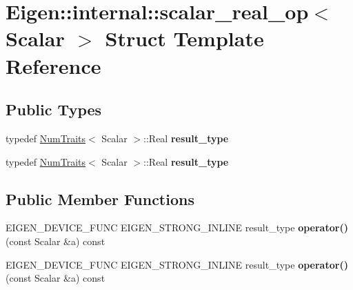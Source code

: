 \hypertarget{struct_eigen_1_1internal_1_1scalar__real__op}{}\section{Eigen\+:\+:internal\+:\+:scalar\+\_\+real\+\_\+op$<$ Scalar $>$ Struct Template Reference}
\label{struct_eigen_1_1internal_1_1scalar__real__op}
\subsection*{Public Types}
\begin{DoxyCompactItemize}
\item 
\mbox{\label{struct_eigen_1_1internal_1_1scalar__real__op_af6520ddd4677e32fc7c8d86c3d2f4033}} 
typedef \hyperlink{group___core___module_struct_eigen_1_1_num_traits}{Num\+Traits}$<$ Scalar $>$\+::Real {\bfseries result\+\_\+type}
\item 
\mbox{\label{struct_eigen_1_1internal_1_1scalar__real__op_af6520ddd4677e32fc7c8d86c3d2f4033}} 
typedef \hyperlink{group___core___module_struct_eigen_1_1_num_traits}{Num\+Traits}$<$ Scalar $>$\+::Real {\bfseries result\+\_\+type}
\end{DoxyCompactItemize}
\subsection*{Public Member Functions}
\begin{DoxyCompactItemize}
\item 
\mbox{\label{struct_eigen_1_1internal_1_1scalar__real__op_ab7456c0d19c3abd50af51c799b0a5fee}} 
E\+I\+G\+E\+N\+\_\+\+D\+E\+V\+I\+C\+E\+\_\+\+F\+U\+NC E\+I\+G\+E\+N\+\_\+\+S\+T\+R\+O\+N\+G\+\_\+\+I\+N\+L\+I\+NE result\+\_\+type {\bfseries operator()} (const Scalar \&a) const
\item 
\mbox{\label{struct_eigen_1_1internal_1_1scalar__real__op_ab7456c0d19c3abd50af51c799b0a5fee}} 
E\+I\+G\+E\+N\+\_\+\+D\+E\+V\+I\+C\+E\+\_\+\+F\+U\+NC E\+I\+G\+E\+N\+\_\+\+S\+T\+R\+O\+N\+G\+\_\+\+I\+N\+L\+I\+NE result\+\_\+type {\bfseries operator()} (const Scalar \&a) const
\end{DoxyCompactItemize}



